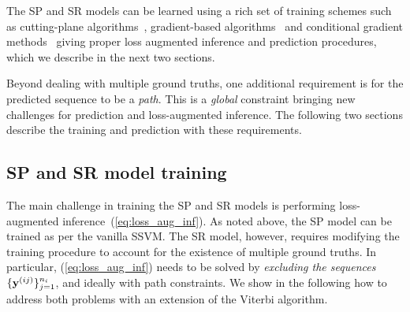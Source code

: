 
The SP and SR models can be learned using a rich set of training schemes such as
cutting-plane algorithms~\cite{joachims2009predicting}, %
gradient-based algorithms~\cite{ratliff2006subgradient} %
and conditional gradient methods~\cite{lacoste2013block} %
giving proper loss augmented inference and prediction procedures,
which we describe in the next two sections.

Beyond dealing with multiple ground truths,
one additional requirement is for the predicted sequence to be a {\em path}.
This is a {\em global} constraint bringing new challenges for prediction and loss-augmented inference.
The following two sections describe the training and prediction with these requirements.

\subsection{SP and SR model training}
\label{ssec:training}

The main challenge in training the SP and SR models is performing loss-augmented inference~(\ref{eq:loss_aug_inf}).
As noted above, the SP model can be trained as per the vanilla SSVM.
The SR model, however, requires modifying the training procedure to account for the existence of multiple ground truths.
In particular, (\ref{eq:loss_aug_inf}) needs to be solved by \emph{excluding the sequences} $\{\mathbf{y}^{({ij})}\}_{j=1}^{n_i}$, and ideally with {\sc path} constraints.
We show in the following how to address both problems with an extension of the Viterbi algorithm.

